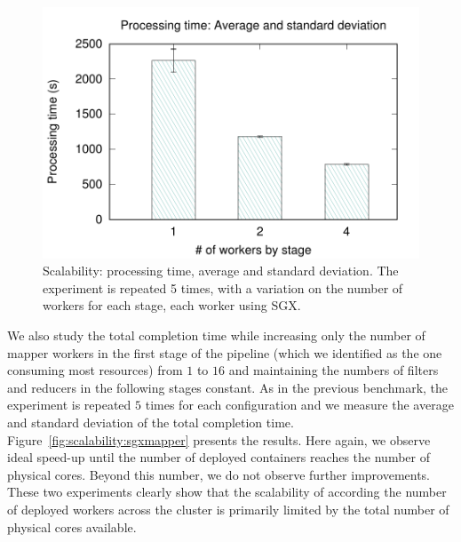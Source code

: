 \begin{figure}[t!]
  \centering  \includegraphics[width=\linewidth]{plots/secure_streams/scalability/sgxfull_scalability}
  \caption{Scalability: processing time, average and standard deviation. The experiment is repeated 5 times, with a variation on the number of workers for each stage, each worker using SGX.}
  \label{fig:scalability:sgxfull}
\end{figure}


We also study the total completion time while increasing only the number of mapper workers in the first stage of the pipeline (which we identified as the one consuming most resources) from $1$ to $16$ and maintaining the numbers of filters and reducers in the following stages constant.
As in the previous benchmark, the experiment is repeated $5$ times for each configuration and we measure the average and standard deviation of the total completion time.
Figure~\ref{fig:scalability:sgxmapper} presents the results.
Here again, we observe ideal speed-up until the number of deployed containers reaches the number of physical cores.
Beyond this number, we do not observe further improvements.
These two experiments clearly show that the scalability of \SYS{} according the number of deployed workers across the cluster is primarily limited by the total number of physical cores available.

